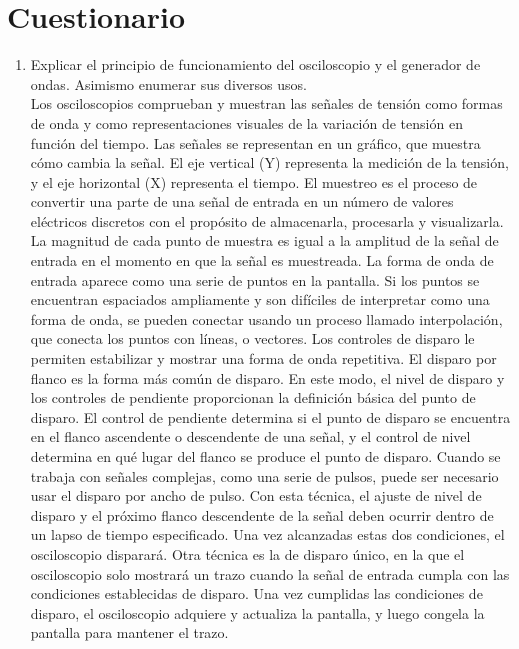 \documentclass[a4paper,12pt]{report}
\begin{document}
\chapter{Cuestionario}
\begin{enumerate}
\item Explicar el principio de funcionamiento del osciloscopio y el generador de ondas. Asimismo enumerar sus diversos usos.\\
Los osciloscopios comprueban y muestran las señales de tensión como formas de onda y como representaciones visuales de la variación de tensión en función del tiempo. Las señales se representan en un gráfico, que muestra cómo cambia la señal. El eje vertical (Y) representa la medición de la tensión, y el eje horizontal (X) representa el tiempo.
El muestreo es el proceso de convertir una parte de una señal de entrada en un número de valores eléctricos discretos con el propósito de almacenarla, procesarla y visualizarla. La magnitud de cada punto de muestra es igual a la amplitud de la señal de entrada en el momento en que la señal es muestreada.
La forma de onda de entrada aparece como una serie de puntos en la pantalla. Si los puntos se encuentran espaciados ampliamente y son difíciles de interpretar como una forma de onda, se pueden conectar usando un proceso llamado interpolación, que conecta los puntos con líneas, o vectores.
Los controles de disparo le permiten estabilizar y mostrar una forma de onda repetitiva.
El disparo por flanco es la forma más común de disparo. En este modo, el nivel de disparo y los controles de pendiente proporcionan la definición básica del punto de disparo. El control de pendiente determina si el punto de disparo se encuentra en el flanco ascendente o descendente de una señal, y el control de nivel determina en qué lugar del flanco se produce el punto de disparo.
Cuando se trabaja con señales complejas, como una serie de pulsos, puede ser necesario usar el disparo por ancho de pulso. Con esta técnica, el ajuste de nivel de disparo y el próximo flanco descendente de la señal deben ocurrir dentro de un lapso de tiempo especificado. Una vez alcanzadas estas dos condiciones, el osciloscopio disparará.
Otra técnica es la de disparo único, en la que el osciloscopio solo mostrará un trazo cuando la señal de entrada cumpla con las condiciones establecidas de disparo. Una vez cumplidas las condiciones de disparo, el osciloscopio adquiere y actualiza la pantalla, y luego congela la pantalla para mantener el trazo.

\end{enumerate}
\end{document}
